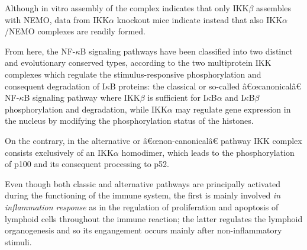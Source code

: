 \documentclass[12pt,a4paper]{report}
\begin{document}
Although in vitro assembly of the complex indicates that only IKK$\beta$ assembles with NEMO, data from IKK$\alpha$ knockout mice indicate instead that also IKK$\alpha$/NEMO
complexes are readily formed.

From here, the NF-$\kappa$B signaling pathways have been classified into two distinct and evolutionary
conserved types, according to the two multiprotein IKK complexes which regulate the stimulus-responsive phosphorylation and consequent degradation of I$\kappa$B proteins: the classical or so-called â€œcanonicalâ€ NF-$\kappa$B signaling pathway where IKK$\beta$ is sufficient for I$\kappa$B$\alpha$ and
I$\kappa$B$\beta$ phosphorylation and degradation, while IKK$\alpha$ may regulate gene expression in the
nucleus by modifying the phosphorylation status of the histones.

On the contrary, in the
alternative or â€œnon-canonicalâ€ pathway IKK complex consists exclusively of an IKK$\alpha$ homodimer, which leads to the phosphorylation of p100 and its consequent processing to p52.

Even though both classic and alternative pathways are principally activated during the functioning of the immune system, the first is mainly involved \emph{in inflammation response} as in the regulation of proliferation and apoptosis of lymphoid cells throughout the
immune reaction; the latter regulates the lymphoid organogenesis and so its engangement occurs mainly after non-inflammatory stimuli.





  
\end{document}

